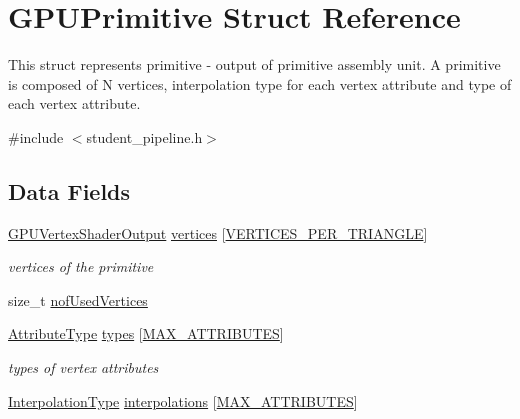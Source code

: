 \hypertarget{structGPUPrimitive}{\section{G\-P\-U\-Primitive Struct Reference}
\label{structGPUPrimitive}
}


This struct represents primitive -\/ output of primitive assembly unit. A primitive is composed of N vertices, interpolation type for each vertex attribute and type of each vertex attribute.  




{\ttfamily \#include $<$student\-\_\-pipeline.\-h$>$}

\subsection*{Data Fields}
\begin{DoxyCompactItemize}
\item 
\hypertarget{structGPUPrimitive_a18413cb45917a0f4a519d4807c06a1b6}{\hyperlink{structGPUVertexShaderOutput}{G\-P\-U\-Vertex\-Shader\-Output} \hyperlink{structGPUPrimitive_a18413cb45917a0f4a519d4807c06a1b6}{vertices} \mbox{[}\hyperlink{fwd_8h_a67df0e09b776eea53360bcc8f4a82ac9}{V\-E\-R\-T\-I\-C\-E\-S\-\_\-\-P\-E\-R\-\_\-\-T\-R\-I\-A\-N\-G\-L\-E}\mbox{]}}\label{structGPUPrimitive_a18413cb45917a0f4a519d4807c06a1b6}

\begin{DoxyCompactList}\small\item\em vertices of the primitive \end{DoxyCompactList}\item 
size\-\_\-t \hyperlink{structGPUPrimitive_aaeea5342673689813c4aff110677d403}{nof\-Used\-Vertices}
\item 
\hypertarget{structGPUPrimitive_abf05f0fa2a0b01eddf768d0f8daf0fb9}{\hyperlink{program_8h_a349a9cde14be8097df865ba0469c0ab2}{Attribute\-Type} \hyperlink{structGPUPrimitive_abf05f0fa2a0b01eddf768d0f8daf0fb9}{types} \mbox{[}\hyperlink{fwd_8h_a4d992a1f9192388588184753115f6c03}{M\-A\-X\-\_\-\-A\-T\-T\-R\-I\-B\-U\-T\-E\-S}\mbox{]}}\label{structGPUPrimitive_abf05f0fa2a0b01eddf768d0f8daf0fb9}

\begin{DoxyCompactList}\small\item\em types of vertex attributes \end{DoxyCompactList}\item 
\hyperlink{program_8h_a8472f01c511d77bbfb981a46618ea1ea}{Interpolation\-Type} \hyperlink{structGPUPrimitive_a52b0316277ee6ac63d4e898ea3bb1864}{interpolations} \mbox{[}\hyperlink{fwd_8h_a4d992a1f9192388588184753115f6c03}{M\-A\-X\-\_\-\-A\-T\-T\-R\-I\-B\-U\-T\-E\-S}\mbox{]}
\end{DoxyCompactItemize}


